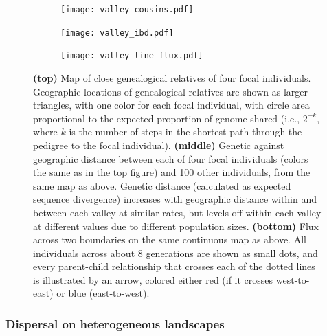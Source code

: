 \documentclass{ar-1col}
\begin{document}
\begin{figure}	%
    \centering
    \begin{subfigure}{0.85\textwidth}
        \centering
        \texttt{[image: valley\_cousins.pdf]}
        \label{cousin_map}
    \end{subfigure}
    \begin{subfigure}{0.75\textwidth}
        \centering
        \texttt{[image: valley\_ibd.pdf]}
        \label{ibd}
    \end{subfigure}
    \begin{subfigure}{0.85\textwidth}
        \centering
        \texttt{[image: valley\_line\_flux.pdf]}
        \label{valleyflux}
    \end{subfigure}
        \caption{
            \textbf{(top)} Map of close genealogical relatives of four focal individuals.
            Geographic locations of 
            genealogical relatives are shown as larger triangles, with one color for each focal individual,
            with circle area proportional to the expected proportion of genome shared
            (i.e., $2^{-k}$, where $k$ is the number of steps in the shortest path through the pedigree to the focal individual).
            \textbf{(middle)}
            Genetic against geographic distance between each of four focal individuals
            (colors the same as in the top figure)
            and 100 other individuals, from the same map as above.
            Genetic distance (calculated as expected sequence divergence)
            increases with geographic distance within and between each valley at similar rates,
            but levels off within each valley at different values
            due to different population sizes.
            \textbf{(bottom)}
            Flux across two boundaries on the same continuous map as above.
            All individuals across about 8 generations are shown as small dots,
            and every parent-child relationship that crosses each of the dotted lines
            is illustrated by an arrow, colored either red (if it crosses west-to-east) or blue (east-to-west).
        }
        \label{fig:dispersal}
\end{figure}

\subsubsection{Dispersal on heterogeneous landscapes}
\end{document}
